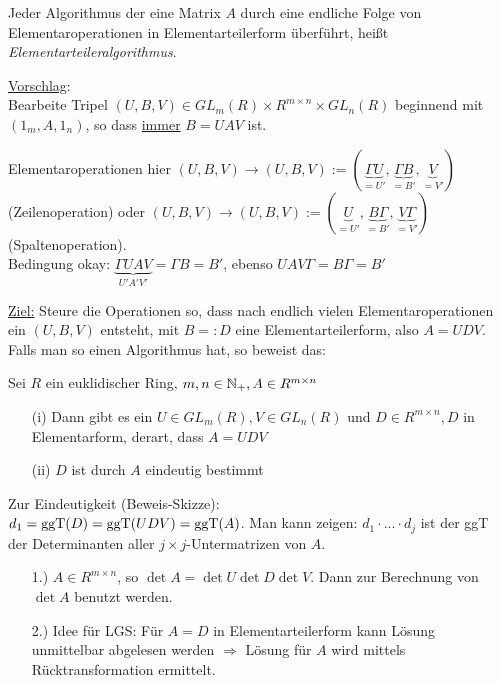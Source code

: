 \documentclass[a4paper,DIV15,BCOR12mm]{article}
\begin{document}
Jeder Algorithmus der eine Matrix $A$ durch eine endliche Folge von
Elementaroperationen in Elementarteilerform überführt, heißt
\emph{Elementarteileralgorithmus}.

\underline{Vorschlag}:\\
Bearbeite Tripel $(U,B, V) \in GL_m(R) \times R^{m \times n} \times
GL_n(R)$ beginnend mit $(1_m, A, 1_n)$, so dass \underline{immer} $B
= UAV$ ist.

Elementaroperationen hier $(U,B,V) \to (U,B,V) := (\underbrace{\Gamma U}_{= U'},\underbrace{\Gamma B}_{= B'}, \underbrace{V}_{= V'})$ (Zeilenoperation) oder $(U,B,V) \to (U,B,V) := (\underbrace{U}_{= U'},\underbrace{B \Gamma}_{= B'}, \underbrace{V \Gamma}_{= V'})$ (Spaltenoperation).\\
Bedingung okay: $\underbrace{\Gamma UAV}_{U'A'V'} = \Gamma B = B'$,
ebenso $UAV\Gamma = B \Gamma = B'$

\underline{Ziel:} Steure die Operationen so, dass nach endlich vielen Elementaroperationen ein $(U,B,V)$ entsteht, mit $B =: D$ eine Elementarteilerform, also $A = UDV$.\\
Falls man so einen Algorithmus hat, so beweist das:
\begin{satz}[Elementarteilersatz]
    Sei $R$ ein euklidischer Ring, $m, n \in \mathbb{N}_+, A \in R^{m \times n}$
    \begin{itemize}
        \item[(i)] Dann gibt es ein $U \in GL_m(R), V \in GL_n(R)$ und $D \in R^{m \times n}, D$ in Elementarform, derart, dass \underline{$A = UDV$}
        \item[(ii)] $D$ ist durch $A$ eindeutig bestimmt
    \end{itemize}
\end{satz}

Zur Eindeutigkeit (Beweis-Skizze):\\
$d_1 = \mathop{\rm ggT}\nolimits(D) = \mathop{\rm ggT}\nolimits(UDV) = \mathop{\rm ggT}\nolimits(A)$. Man kann zeigen: $d_1 \cdot
... \cdot d_j$ ist der ggT der Determinanten aller $j \times
j$-Untermatrizen von $A$.

\begin{bemerkung}
    \begin{itemize}
        \item[1.)] $A \in R^{m \times n}$, so $\det A = \det U \det D \det V$. Dann zur Berechnung von $\det A$ benutzt werden.
        \item[2.)] Idee für LGS: Für $A = D$ in Elementarteilerform kann Lösung unmittelbar abgelesen werden $\Rightarrow$ Lösung für $A$ wird mittels Rücktransformation ermittelt.
    \end{itemize}
\end{bemerkung}
\end{document}
